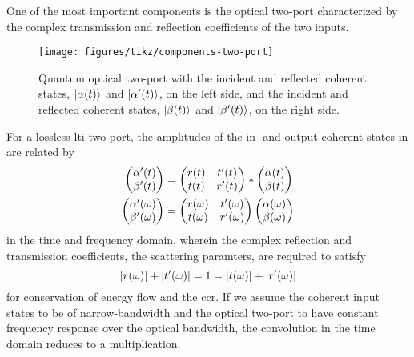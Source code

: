 One of the most important components is the optical two-port characterized by the complex transmission and reflection coefficients of the two inputs.
\begin{figure}[htb]
    \centering
    \texttt{[image: figures/tikz/components-two-port]}
    \caption{Quantum optical two-port with the incident and reflected coherent states, $\lvert\alpha(t)\rangle$ and $\lvert\alpha^\prime(t)\rangle$, on the left side, and the incident and reflected coherent states, $\lvert\beta(t)\rangle$ and $\lvert\beta^\prime(t)\rangle$, on the right side.}\label{fig:components_two_port}
\end{figure}
For a lossless \gls{lti} two-port, the amplitudes of the in- and output coherent states in  are related by
\begin{align}
	\begin{pmatrix}
		\alpha^\prime(t)
		\\
		\beta^\prime(t)
	\end{pmatrix}
	&=
	\begin{pmatrix}
		r(t) & t^\prime(t) \\
		t(t) & r^\prime(t)
	\end{pmatrix}
	\ast
	\begin{pmatrix}
		\alpha(t)
		\\
		\beta(t)
	\end{pmatrix}
	\\
	\begin{pmatrix}
		\alpha^\prime(\omega)
		\\
		\beta^\prime(\omega)
	\end{pmatrix}
	&=
	\begin{pmatrix}
		r(\omega) & t^\prime(\omega) \\
		t(\omega) & r^\prime(\omega)
	\end{pmatrix}
	\begin{pmatrix}
		\alpha(\omega)
		\\
		\beta(\omega)
	\end{pmatrix}
\end{align}
in the time and frequency domain, wherein the complex reflection and transmission coefficients, the scattering paramters, are required to satisfy
\begin{equation}
	\lvert r(\omega)\rvert
	+
	\lvert t^\prime(\omega)\rvert
	=
	1
	=
	\lvert t(\omega)\rvert
	+
	\lvert r^\prime(\omega)\rvert
\end{equation}
for conservation of energy flow and the \gls{ccr}.
If we assume the coherent input states to be of narrow-bandwidth and the optical two-port to have constant frequency response over the optical bandwidth, the convolution in the time domain reduces to a multiplication.
